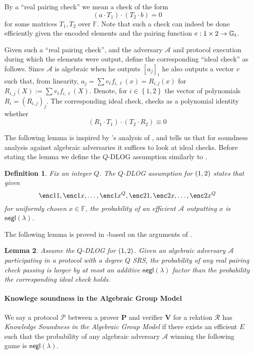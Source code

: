 \documentclass[11pt]{article} %
\newcommand{\Gt}{\ensuremath{{\mathbb G}_t}\xspace}
\newcommand{\F}{\ensuremath{\mathbb F}\xspace}
\newcommand{\adv}{\ensuremath{\mathcal A}\xspace}
\newcommand{\negl}{\ensuremath{\mathsf{negl}(\lambda)}\xspace}
\newcommand{\defeq}{:=}
\newcommand{\enci}[1]{\ensuremath{\left[#1\right]_i}\xspace}
\newcommand{\prv}{\ensuremath{\mathsf{\mathbf{P}}}\xspace}
\newcommand{\ver}{\ensuremath{\mathsf{\mathbf{V}}}\xspace}
\newcommand{\rel}{\ensuremath{\mathcal{R}}\xspace}
\newcommand{\ext}{\ensuremath{E}\xspace}
\newcommand{\set}[1]{\ensuremath{\left\{#1\right\}}\xspace}
\newcommand{\prot}{\ensuremath{\mathscr{P}}\xspace}
\newtheorem{lemma}{Lemma}[section]
\newtheorem{dfn}[lemma]{Definition}
\begin{document}
By a ``real pairing check'' we mean a check of the form
\[(a\cdot T_1) \cdot (T_2\cdot b)=0\]
for some matrices $T_1,T_2$ over $\F$.
Note that such a check can indeed be done efficiently given the encoded elements and the pairing function $e:\G1\times \G2\to \Gt$.



Given such a ``real pairing check'', and the adversary \adv and protocol execution during which the elements were output, define the corresponding ``ideal check'' as follows.
Since \adv is algebraic when he outputs \enci{a_j} he also outputs a vector $v$ such that, from linearity, $a_j = \sum v_\ell f_{i,\ell}(x)=R_{i,j}(x)$ for $R_{i,j}(X) \defeq \sum v_\ell f_{i,\ell}(X)$.
Denote, for $i\in \set{1,2}$ the vector of polynomials $R_i=(R_{i,j})_j$.
The corresponding ideal check, checks as a polynomial identity whether
\[(R_1 \cdot T_1)\cdot (T_2\cdot R_2) \equiv 0\]


The following lemma is inspired by \cite{AGM}'s analysis of \cite{groth16},
and tells us that for soundness analysis against algebraic adversaries it suffices to look at ideal checks.
Before stating the lemma we define the $Q$-DLOG assumption similarly to \cite{AGM}.
\begin{dfn}\label{ref:qdlog}
 Fix an integer $Q$. The \emph{$Q$-DLOG assumption for $(\G1,\G2)$} states that given
 \[\enc1{1},\enc1{x},\ldots,\enc1{x^Q},\enc2{1},\enc2{x},\ldots,\enc2{x^Q}\]
 for uniformly chosen $x\in \F$, the probability of an efficient \adv outputting $x$
 is \negl.
\end{dfn}


The following lemma is proved in \cite{plonk}-based on the arguments of \cite{AGM}.
\begin{lemma}\label{lem:AGManalysis}
Assume the $Q$-DLOG for $(\G1,\G2)$.
 Given an algebraic adversary \adv participating in a protocol with a degree $Q$ SRS,
 the probability of any real pairing check passing is larger by at most an additive \negl factor than the probability the corresponding ideal check holds.
\end{lemma}


\paragraph{Knowlege soundness in the Algebraic Group Model}
We say a protocol \prot between a prover \prv and verifier \ver for a relation \rel has \emph{Knowledge Soundness in the Algebraic Group Model} if there exists an efficient \ext such that
the probability of any algebraic adversary \adv winning the following game is \negl.
\end{document}
